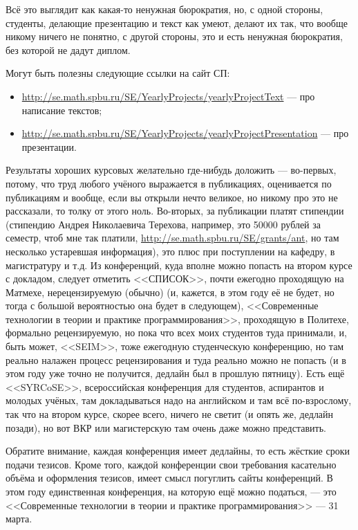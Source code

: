 \documentclass[a5paper]{article}
\begin{document}
Всё это выглядит как какая-то ненужная бюрократия, но, с одной стороны, студенты, делающие презентацию и текст как умеют, делают их так, что вообще никому ничего не понятно, с другой стороны, это и есть ненужная бюрократия, без которой не дадут диплом.

Могут быть полезны следующие ссылки на сайт СП: 
\begin{itemize}
	\item \url{http://se.math.spbu.ru/SE/YearlyProjects/yearlyProjectText} --- про написание текстов;
	\item \url{http://se.math.spbu.ru/SE/YearlyProjects/yearlyProjectPresentation} --- про презентации.
\end{itemize}

Результаты хороших курсовых желательно где-нибудь доложить --- во-первых, потому, что труд любого учёного выражается в публикациях, оценивается по публикациям и вообще, если вы открыли нечто великое, но никому про это не рассказали, то толку от этого ноль. Во-вторых, за публикации платят стипендии (стипендию Андрея Николаевича Терехова, например, это 50000 рублей за семестр, чтоб мне так платили, \url{http://se.math.spbu.ru/SE/grants/ant}, но там несколько устаревшая информация), это плюс при поступлении на кафедру, в магистратуру и т.д. Из конференций, куда вполне можно попасть на втором курсе с докладом, следует отметить <<СПИСОК>>, почти ежегодно проходящую на Матмехе, нерецензируемую (обычно) (и, кажется, в этом году её не будет, но тогда с большой вероятностью она будет в следующем), <<Современные технологии в теории и практике программирования>>, проходящую в Политехе, формально рецензируемую, но пока что всех моих студентов туда принимали, и, быть может, <<SEIM>>, тоже ежегодную студенческую конференцию, но там реально налажен процесс рецензирования и туда реально можно не попасть (и в этом году уже точно не получится, дедлайн был в прошлую пятницу). Есть ещё <<SYRCoSE>>, всероссийская конференция для студентов, аспирантов и молодых учёных, там докладываться надо на английском и там всё по-взрослому, так что на втором курсе, скорее всего, ничего не светит (и опять же, дедлайн позади), но вот ВКР или магистерскую там очень даже можно представить. 

Обратите внимание, каждая конференция имеет дедлайны, то есть жёсткие сроки подачи тезисов. Кроме того,  каждой конференции свои требования касательно объёма и оформления тезисов, имеет смысл погуглить сайты конференций. В этом году единственная конференция, на которую ещё можно податься, --- это <<Современные технологии в теории и практике программирования>> --- 31 марта.
\end{document}
